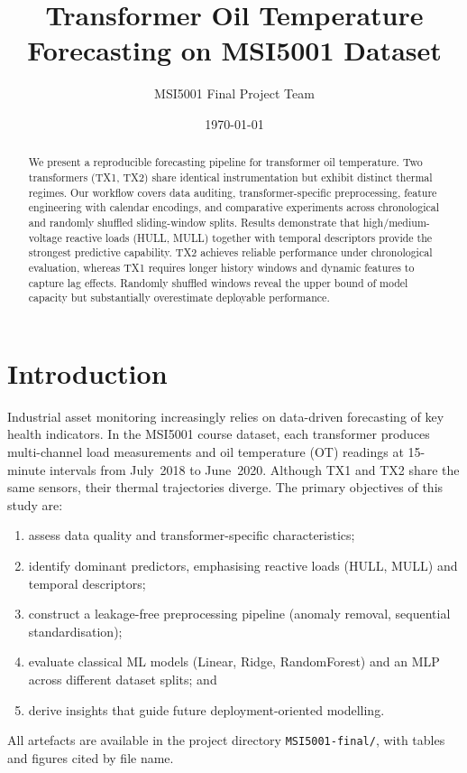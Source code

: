 \documentclass[11pt]{article}
\title{Transformer Oil Temperature Forecasting on MSI5001 Dataset}
\author{MSI5001 Final Project Team}
\date{\today}
\begin{document}
\maketitle

\begin{abstract}
We present a reproducible forecasting pipeline for transformer oil temperature. Two transformers (TX1, TX2) share identical instrumentation but exhibit distinct thermal regimes. Our workflow covers data auditing, transformer-specific preprocessing, feature engineering with calendar encodings, and comparative experiments across chronological and randomly shuffled sliding-window splits. Results demonstrate that high/medium-voltage reactive loads (HULL, MULL) together with temporal descriptors provide the strongest predictive capability. TX2 achieves reliable performance under chronological evaluation, whereas TX1 requires longer history windows and dynamic features to capture lag effects. Randomly shuffled windows reveal the upper bound of model capacity but substantially overestimate deployable performance.
\end{abstract}

\section{Introduction}
Industrial asset monitoring increasingly relies on data-driven forecasting of key health indicators. In the MSI5001 course dataset, each transformer produces multi-channel load measurements and oil temperature (OT) readings at 15-minute intervals from July~2018 to June~2020. Although TX1 and TX2 share the same sensors, their thermal trajectories diverge. The primary objectives of this study are:
\begin{enumerate}
    \item assess data quality and transformer-specific characteristics;
    \item identify dominant predictors, emphasising reactive loads (HULL, MULL) and temporal descriptors;
    \item construct a leakage-free preprocessing pipeline (anomaly removal, sequential standardisation);
    \item evaluate classical ML models (Linear, Ridge, RandomForest) and an MLP across different dataset splits; and
    \item derive insights that guide future deployment-oriented modelling.
\end{enumerate}
All artefacts are available in the project directory \texttt{MSI5001-final/}, with tables and figures cited by file name.
\end{document}
